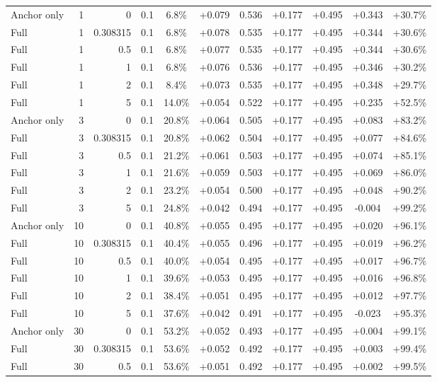 \begin{table}[htbp]
\begin{tabular}{lrrrccccccc}
Anchor only & 1 & 0 & 0.1 & 6.8\% & +0.079 & 0.536 & +0.177 & +0.495 & +0.343 & +30.7\% \\
Full & 1 & 0.308315 & 0.1 & 6.8\% & +0.078 & 0.535 & +0.177 & +0.495 & +0.344 & +30.6\% \\
Full & 1 & 0.5 & 0.1 & 6.8\% & +0.077 & 0.535 & +0.177 & +0.495 & +0.344 & +30.6\% \\
Full & 1 & 1 & 0.1 & 6.8\% & +0.076 & 0.536 & +0.177 & +0.495 & +0.346 & +30.2\% \\
Full & 1 & 2 & 0.1 & 8.4\% & +0.073 & 0.535 & +0.177 & +0.495 & +0.348 & +29.7\% \\
Full & 1 & 5 & 0.1 & 14.0\% & +0.054 & 0.522 & +0.177 & +0.495 & +0.235 & +52.5\% \\
Anchor only & 3 & 0 & 0.1 & 20.8\% & +0.064 & 0.505 & +0.177 & +0.495 & +0.083 & +83.2\% \\
Full & 3 & 0.308315 & 0.1 & 20.8\% & +0.062 & 0.504 & +0.177 & +0.495 & +0.077 & +84.6\% \\
Full & 3 & 0.5 & 0.1 & 21.2\% & +0.061 & 0.503 & +0.177 & +0.495 & +0.074 & +85.1\% \\
Full & 3 & 1 & 0.1 & 21.6\% & +0.059 & 0.503 & +0.177 & +0.495 & +0.069 & +86.0\% \\
Full & 3 & 2 & 0.1 & 23.2\% & +0.054 & 0.500 & +0.177 & +0.495 & +0.048 & +90.2\% \\
Full & 3 & 5 & 0.1 & 24.8\% & +0.042 & 0.494 & +0.177 & +0.495 & -0.004 & +99.2\% \\
Anchor only & 10 & 0 & 0.1 & 40.8\% & +0.055 & 0.495 & +0.177 & +0.495 & +0.020 & +96.1\% \\
Full & 10 & 0.308315 & 0.1 & 40.4\% & +0.055 & 0.496 & +0.177 & +0.495 & +0.019 & +96.2\% \\
Full & 10 & 0.5 & 0.1 & 40.0\% & +0.054 & 0.495 & +0.177 & +0.495 & +0.017 & +96.7\% \\
Full & 10 & 1 & 0.1 & 39.6\% & +0.053 & 0.495 & +0.177 & +0.495 & +0.016 & +96.8\% \\
Full & 10 & 2 & 0.1 & 38.4\% & +0.051 & 0.495 & +0.177 & +0.495 & +0.012 & +97.7\% \\
Full & 10 & 5 & 0.1 & 37.6\% & +0.042 & 0.491 & +0.177 & +0.495 & -0.023 & +95.3\% \\
Anchor only & 30 & 0 & 0.1 & 53.2\% & +0.052 & 0.493 & +0.177 & +0.495 & +0.004 & +99.1\% \\
Full & 30 & 0.308315 & 0.1 & 53.6\% & +0.052 & 0.492 & +0.177 & +0.495 & +0.003 & +99.4\% \\
Full & 30 & 0.5 & 0.1 & 53.6\% & +0.051 & 0.492 & +0.177 & +0.495 & +0.002 & +99.5\% \\

\end{tabular}
\end{table}
